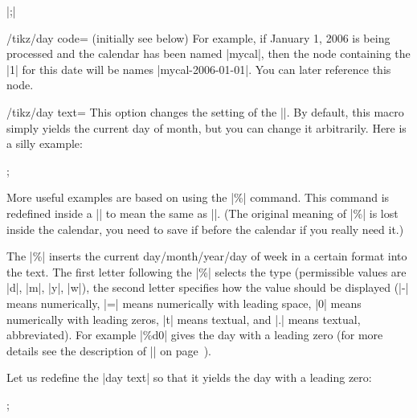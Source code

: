 \begin{command}{\calendar {}|;|}
\begin{key}{/tikz/day code= (initially \normalfont see below)}
        For example, if January 1, 2006 is being processed and the calendar has
        been named |mycal|, then the node containing the |1| for this date will
        be names |mycal-2006-01-01|. You can later reference this node.
\begin{codeexample}[]
\end{codeexample}
    \end{key}

    \begin{key}{/tikz/day text=}
        This option changes the setting of the |\tikzdaytext|. By default, this
        macro simply yields the current day of month, but you can change it
        arbitrarily. Here is a silly example:
\begin{codeexample}[]
\tikz \calendar[dates=2000-01-01 to 2000-01-31,week list,
                day text=x];
\end{codeexample}
        More useful examples are based on using the |\%| command. This command
        is redefined inside a |\pgfcalendar| to mean the same as
        |\pgfcalendarshorthand|. (The original meaning of |\%| is lost inside
        the calendar, you need to save if before the calendar if you really
        need it.)

        The |\%| inserts the current day/month/year/day of week in a certain
        format into the text. The first letter following the |\%| selects the
        type (permissible values are |d|, |m|, |y|, |w|), the second letter
        specifies how the value should be displayed (|-| means numerically, |=|
        means numerically with leading space, |0| means numerically with
        leading zeros, |t| means textual, and |.| means textual, abbreviated).
        For example |\%d0| gives the day with a leading zero (for more details
        see the description of |\pgfcalendarshorthand| on
        page~\pageref{pgfcalendarshorthand}).

        Let us redefine the |day text| so that it yields the day with a leading
        zero:
\begin{codeexample}
\tikz \calendar[dates=2000-01-01 to 2000-01-31,week list,
                day text=\%d0];
\end{codeexample}
    \end{key}


\end{command}
